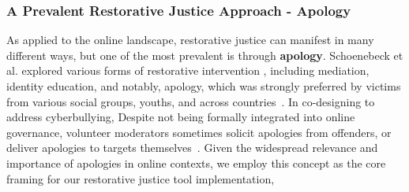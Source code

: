 \subsubsection{A Prevalent Restorative Justice Approach - Apology}
As applied to the online landscape, restorative justice can manifest in many different ways, but one of the most prevalent is through \textbf{apology}. Schoenebeck et al. explored various forms of restorative intervention , including mediation, identity education, and notably, apology, which was strongly preferred by victims from various social groups, youths, and across countries~\cite{Schoenebeck2021a, Schoenebeck2021b, Schoenebeck2023}. In co-designing to address cyberbullying,  Despite not being formally integrated into online governance, volunteer moderators sometimes solicit apologies from offenders, or deliver apologies to targets themselves~\cite{Matias2019, Seering2019}. Given the widespread relevance and importance of apologies in online contexts, we employ this concept as the core framing for our restorative justice tool implementation, 

